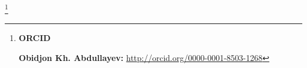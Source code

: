 \RuDate



\smallskip



\makeentitle





\smallskip



\thanks{{\bf ORCID}



{\bf  Obidjon Kh. Abdullayev:} \url{http://orcid.org/0000-0001-8503-1268}



}





\EngRef



